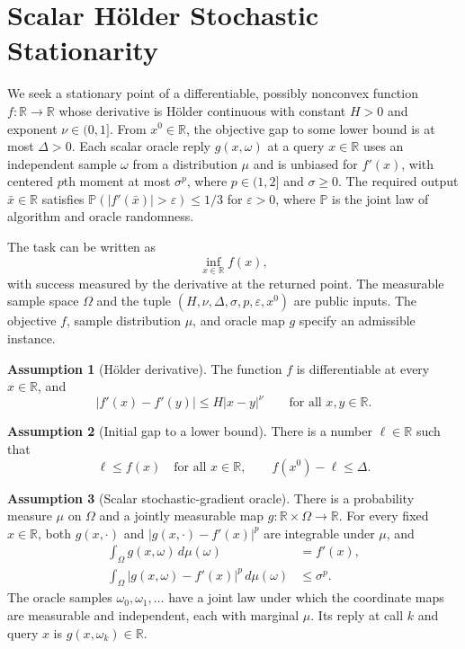 \documentclass[10pt]{article}
\theoremstyle{definition}
\newtheorem{assumption}{Assumption}
\begin{document}
\section*{Scalar H\"older Stochastic Stationarity}
We seek a stationary point of a differentiable, possibly nonconvex function $f:\mathbb{R}\to\mathbb{R}$ whose derivative is H\"older continuous with constant $H>0$ and exponent $\nu\in(0,1]$. From $x^0\in\mathbb{R}$, the objective gap to some lower bound is at most $\Delta>0$. Each scalar oracle reply $g(x,\omega)$ at a query $x\in\mathbb{R}$ uses an independent sample $\omega$ from a distribution $\mu$ and is unbiased for $f'(x)$, with centered $p$th moment at most $\sigma^p$, where $p\in(1,2]$ and $\sigma\geq0$. The required output $\bar{x}\in\mathbb{R}$ satisfies $\mathbb{P}(|f'(\bar{x})|>\varepsilon)\leq 1/3$ for $\varepsilon>0$, where $\mathbb{P}$ is the joint law of algorithm and oracle randomness.

The task can be written as
\[
\inf_{x\in\mathbb{R}} f(x),
\]
with success measured by the derivative at the returned point. The measurable sample space $\Omega$ and the tuple $(H,\nu,\Delta,\sigma,p,\varepsilon,x^0)$ are public inputs. The objective $f$, sample distribution $\mu$, and oracle map $g$ specify an admissible instance.

\begin{assumption}[H\"older derivative]
The function $f$ is differentiable at every $x\in\mathbb{R}$, and
\[
|f'(x)-f'(y)|\leq H|x-y|^{\nu}
\qquad\text{for all }x,y\in\mathbb{R}.
\]
\end{assumption}

\begin{assumption}[Initial gap to a lower bound]
There is a number $\ell\in\mathbb{R}$ such that
\[
\ell\leq f(x)\quad\text{for all }x\in\mathbb{R},
\qquad f(x^0)-\ell\leq\Delta.
\]
\end{assumption}

\begin{assumption}[Scalar stochastic-gradient oracle]
There is a probability measure $\mu$ on $\Omega$ and a jointly measurable map $g:\mathbb{R}\times\Omega\to\mathbb{R}$. For every fixed $x\in\mathbb{R}$, both $g(x,\cdot)$ and $|g(x,\cdot)-f'(x)|^p$ are integrable under $\mu$, and
\begin{align*}
\int_{\Omega}g(x,\omega)\,d\mu(\omega)&=f'(x),\\
\int_{\Omega}|g(x,\omega)-f'(x)|^p\,d\mu(\omega)&\leq\sigma^p.
\end{align*}
The oracle samples $\omega_0,\omega_1,\ldots$ have a joint law under which the coordinate maps are measurable and independent, each with marginal $\mu$. Its reply at call $k$ and query $x$ is $g(x,\omega_k)\in\mathbb{R}$.
\end{assumption}
\end{document}
